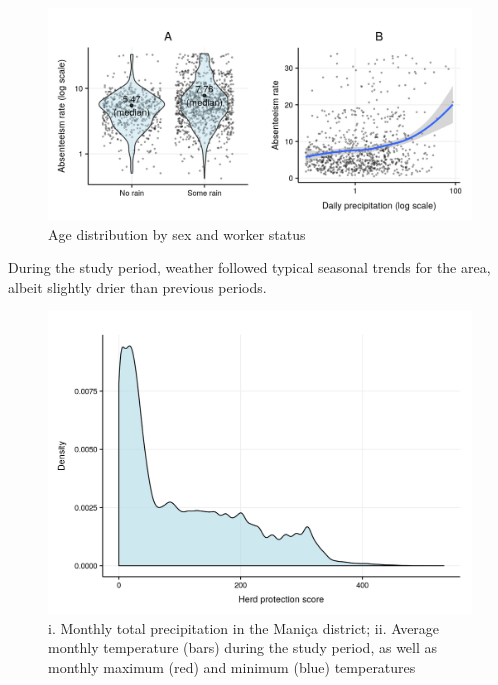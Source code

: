 \documentclass[]{article}
\begin{document}
\begin{figure}[!h]

{\centering \includegraphics{figures/unnamed-chunk-20-1} 

}

\caption{Age distribution by sex and worker status}\label{fig:unnamed-chunk-20}
\end{figure}

During the study period, weather followed typical seasonal trends for
the area, albeit slightly drier than previous periods.

\begin{figure}[!h]

{\centering \includegraphics{figures/unnamed-chunk-21-1} 

}

\caption{i. Monthly total precipitation in the Maniça district; ii. Average monthly temperature (bars) during the study period, as well as monthly maximum (red) and minimum (blue) temperatures}\label{fig:unnamed-chunk-21}
\end{figure}
\end{document}
